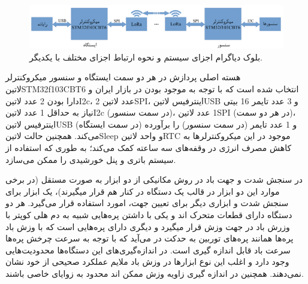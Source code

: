 \begin{figure}[!h]
	\centering
	\includegraphics[width=\linewidth]{Assets/system design.pdf}
	\caption{بلوک دیاگرام اجزای سیستم و نحوه ارتباط اجزای مختلف با یکدیگر.}
	\label{fig:systemDesign}
\end{figure}


هسته اصلی پردازش در هر دو سمت ایستگاه و سنسور میکروکنترلر ‌لاتین{STM32f103CBT6} انتخاب شده است که با توجه به موجود بودن در بازار ایران و دارا بودن 2 عدد ‌لاتین{I2c}، 2 عدد ‌لاتین{SPI}، اینترفیس ‌لاتین{USB} و 3 عدد تایمر 16 بیتی نیاز به حداقل 1 عدد ‌لاتین{I2c} (در سمت سنسور)، 1 عدد ‌لاتین{SPI} (در هر دو سمت)، اینترفیس ‌لاتین{USB} (در سمت ایستگاه)  و 1 عدد تایمر (در سمت سنسور) را برآورده می‌کند. همچنین حالت ‌لاتین{Sleep} و واحد ‌لاتین{RTC} موجود در این میکروکنترلر‌ها به کاهش مصرف انرژی در وقفه‌های سه ساعته کمک می‌کند؛ به طوری که استفاده از سیستم باتری و پنل خورشیدی را ممکن می‌سازد.










در سنجش شدت و جهت باد در روش مکانیکی از دو ابزار به صورت مستقل (در برخی موارد این دو ابزار در قالب یک دستگاه در کنار هم قرار میگیرند)، یک ابزار برای سنجش شدت و ابزاری دیگر برای تعیین جهت، امورد استفاده قرار می‌گیرد. هر دو دستگاه دارای قطعات متحرک اند و یکی با داشتن پره‌هایی شبیه به دم هلی کوپتر با وزرش باد در جهت وزش قرار میگیرد و دیگری دارای پره‌هایی است که با وزش باد پره‌ها همانند پره‌های توربین به حدکت در می‌آید که با توجه به سرعت چرخش پره‌ها سرعت باد قابل اندازه‌ گیری است. در اندازه‌گیری‌های این دستگاه‌ها محدودیت‌هایی وجود دارد و اغلب این نوع ابزارها در وزش باد ملایم عملکرد صحیحی از خود نشان نمی‌دهند. همچنین در اندازه گیری زاویه وزش ممکن اند محدود به زوایای خاصی باشند. 

